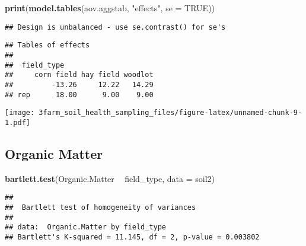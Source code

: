 \documentclass[]{article}
\newenvironment{Shaded}{\begin{snugshade}}{\end{snugshade}}
\newcommand{\KeywordTok}[1]{\textcolor[rgb]{0.13,0.29,0.53}{\textbf{#1}}}
\newcommand{\DataTypeTok}[1]{\textcolor[rgb]{0.13,0.29,0.53}{#1}}
\newcommand{\StringTok}[1]{\textcolor[rgb]{0.31,0.60,0.02}{#1}}
\newcommand{\OtherTok}[1]{\textcolor[rgb]{0.56,0.35,0.01}{#1}}
\newcommand{\OperatorTok}[1]{\textcolor[rgb]{0.81,0.36,0.00}{\textbf{#1}}}
\newcommand{\NormalTok}[1]{#1}
\begin{document}
\begin{Shaded}
\begin{Highlighting}[]
\KeywordTok{print}\NormalTok{(}\KeywordTok{model.tables}\NormalTok{(aov.aggstab, }\StringTok{"effects"}\NormalTok{, }\DataTypeTok{se =} \OtherTok{TRUE}\NormalTok{))}
\end{Highlighting}
\end{Shaded}

\begin{verbatim}
## Design is unbalanced - use se.contrast() for se's
\end{verbatim}

\begin{verbatim}
## Tables of effects
## 
##  field_type 
##     corn field hay field woodlot
##         -13.26     12.22   14.29
## rep      18.00      9.00    9.00
\end{verbatim}

\begin{Shaded}
\end{Shaded}

\texttt{[image: 3farm\_soil\_health\_sampling\_files/figure-latex/unnamed-chunk-9-1.pdf]}

\subsection{Organic Matter}\label{organic-matter}

\begin{Shaded}
\begin{Highlighting}[]
\KeywordTok{bartlett.test}\NormalTok{(Organic.Matter }\OperatorTok{~}\StringTok{ }\NormalTok{field_type, }\DataTypeTok{data =}\NormalTok{ soil2)}
\end{Highlighting}
\end{Shaded}

\begin{verbatim}
## 
##  Bartlett test of homogeneity of variances
## 
## data:  Organic.Matter by field_type
## Bartlett's K-squared = 11.145, df = 2, p-value = 0.003802
\end{verbatim}
\end{document}

